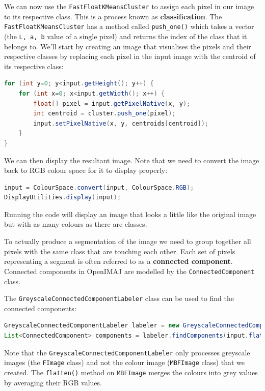 \documentclass[10pt,a4paper,twoside,extrafontsizes]{memoir}
\begin{document}
We can now use the \verb+FastFloatKMeansCluster+ to assign each pixel in our image to its respective 
class. This is a process known as \textbf{classification}. The \verb+FastFloatKMeansCluster+ has a method 
called \verb+push_one()+ which takes a vector (the \verb+L, a, b+ value of a single pixel) and 
returns the index of the class that it belongs to. We'll start by creating an image that 
visualises the pixels and their respective classes by replacing each pixel in the input image 
with the centroid of its respective class:
\begin{lstlisting}[language=java]
for (int y=0; y<input.getHeight(); y++) {
    for (int x=0; x<input.getWidth(); x++) {
        float[] pixel = input.getPixelNative(x, y);
        int centroid = cluster.push_one(pixel);
        input.setPixelNative(x, y, centroids[centroid]);
    }
}
\end{lstlisting}
We can then display the resultant image. Note that we need to convert the image back to RGB 
colour space for it to display properly:
\begin{lstlisting}[language=java]
input = ColourSpace.convert(input, ColourSpace.RGB);
DisplayUtilities.display(input);
\end{lstlisting}
Running the code will display an image that looks a little like the original image but with 
as many colours as there are classes.

To actually produce a segmentation of the image we need to group together all pixels with 
the same class that are touching each other. Each set of pixels representing a segment is 
often referred to as a \textbf{connected component}. Connected components in OpenIMAJ are
modelled by the \verb+ConnectedComponent+ class.

The \verb+GreyscaleConnectedComponentLabeler+ class can be used to find the connected components:
\begin{lstlisting}[language=java]
GreyscaleConnectedComponentLabeler labeler = new GreyscaleConnectedComponentLabeler();
List<ConnectedComponent> components = labeler.findComponents(input.flatten());
\end{lstlisting}
Note that the \verb+GreyscaleConnectedComponentLabeler+ 
only processes greyscale images 
(the \verb+FImage+ class) and not the colour image (\verb+MBFImage+ class) that we created. 
The \verb+flatten()+ method on \verb+MBFImage+ merges the colours into grey values by 
averaging their RGB values.
\end{document}
